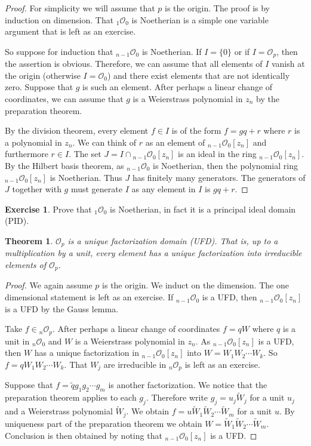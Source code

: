 \documentclass[12pt,openany]{book}
\newcommand{\sO}{{\mathcal{O}}}
\theoremstyle{plain}
\newtheorem{thm}{Theorem}[section]
\theoremstyle{remark}
\theoremstyle{definition}
\theoremstyle{exercise}
\newtheorem{exercise}{Exercise}[section]
\theoremstyle{example}
\begin{document}
\begin{proof}
For simplicity we will assume that $p$ is the origin.  The proof is by
induction on dimension.  That ${}_1\sO_0$ is Noetherian is a simple one
variable argument that is left as an exercise.

So suppose for induction that ${}_{n-1}\sO_0$ is Noetherian.  If $I = \{ 0 \}$
or if $I = \sO_p$, then the assertion is obvious.  Therefore, we can assume
that all elements of $I$ vanish at the origin (otherwise $I = \sO_0$) and
there exist elements that are not identically zero.  Suppose that $g$
is such an element.  After perhaps a linear change of coordinates, we can
assume that $g$ is a Weierstrass polynomial in $z_n$
by the preparation theorem.

By the division theorem,
every element $f \in I$ is of the form $f = gq+r$ where $r$
is a polynomial in $z_n$.  We can think of
$r$ as an element of ${}_{n-1}\sO_0[z_n]$ and furthermore $r \in I$.
The set $J= I \cap {}_{n-1}\sO_0[z_n]$ is an ideal in the
ring ${}_{n-1}\sO_0[z_n]$.  By the Hilbert basis theorem, as
${}_{n-1}\sO_0$ is Noetherian, then the polynomial ring
${}_{n-1}\sO_0[z_n]$ is Noetherian.  Thus $J$ has finitely many generators.
The generators of $J$ together with $g$ must generate $I$ as any
element in $I$ is $gq+r$.
\end{proof}

\begin{exercise}
Prove that ${}_1\sO_0$ is Noetherian, in fact it is a principal ideal domain
(PID).
\end{exercise}

\begin{thm}
$\sO_p$ is a unique factorization domain (UFD).  That is, up to a
multiplication by a unit, every element has a unique factorization into
irreducible elements of $\sO_p$.
\end{thm}

\begin{proof}
We again assume $p$ is the origin.
We induct on the dimension.  The one dimensional statement is left
as an exercise.  If ${}_{n-1}\sO_0$ is a UFD\@, then
${}_{n-1}\sO_0[z_n]$ is a UFD by the Gauss lemma.

Take $f \in {}_n\sO_p$.  After perhaps a linear change of coordinates
$f = qW$ where $q$ is a unit in ${}_n\sO_0$
and $W$ is a Weierstrass polynomial in $z_n$.
As 
${}_{n-1}\sO_0[z_n]$ is a UFD\@, then $W$ has a unique
factorization in 
${}_{n-1}\sO_0[z_n]$ into $W = W_1 W_2 \cdots W_k$.
So $f = q W_1 W_2 \cdots W_k$.  That $W_j$ are irreducible
in ${}_n\sO_p$ is left as an exercise.

Suppose that
$f = \tilde{q} g_1 g_2 \cdots g_m$ is another factorization.  We notice that
the preparation theorem applies to each $g_j$.  Therefore write
$g_j = u_j \tilde{W}_j$ for a unit $u_j$ and a Weierstrass polynomial
$\tilde{W}_j$.  We obtain
$f = u \tilde{W}_1 \tilde{W}_2 \cdots \tilde{W}_m$ for a unit $u$.  By
uniqueness part of the preparation theorem we obtain
$W = \tilde{W}_1 \tilde{W}_2 \cdots \tilde{W}_m$.  Conclusion is then
obtained by noting that
${}_{n-1}\sO_0[z_n]$ is a UFD\@.
\end{proof}
\end{document}
